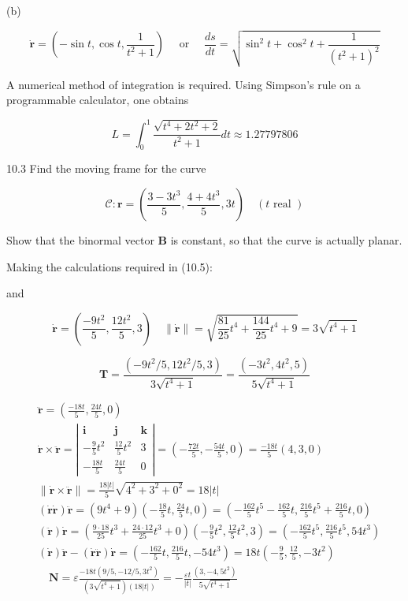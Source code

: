 \documentclass[10pt]{article}
\begin{document}
(b)

$$
\dot{\mathbf{r}}=\left(-\sin t, \cos t, \frac{1}{t^{2}+1}\right) \quad \text { or } \quad \frac{d s}{d t}=\sqrt{\sin ^{2} t+\cos ^{2} t+\frac{1}{\left(t^{2}+1\right)^{2}}}
$$

A numerical method of integration is required. Using Simpson's rule on a programmable calculator, one obtains

$$
L=\int_{0}^{1} \frac{\sqrt{t^{4}+2 t^{2}+2}}{t^{2}+1} d t \approx 1.27797806
$$

10.3 Find the moving frame for the curve

$$
\mathscr{C}: \mathbf{r}=\left(\frac{3-3 t^{3}}{5}, \frac{4+4 t^{3}}{5}, 3 t\right) \quad(t \text { real })
$$

Show that the binormal vector $\mathbf{B}$ is constant, so that the curve is actually planar.

Making the calculations required in (10.5):

and

$$
\dot{\mathbf{r}}=\left(\frac{-9 t^{2}}{5}, \frac{12 t^{2}}{5}, 3\right) \quad\|\dot{\mathbf{r}}\|=\sqrt{\frac{81}{25} t^{4}+\frac{144}{25} t^{4}+9}=3 \sqrt{t^{4}+1}
$$

$$
\mathbf{T}=\frac{\left(-9 t^{2} / 5,12 t^{2} / 5,3\right)}{3 \sqrt{t^{4}+1}}=\frac{\left(-3 t^{2}, 4 t^{2}, 5\right)}{5 \sqrt{t^{4}+1}}
$$

$$
\begin{aligned}
& \ddot{\mathbf{r}}=\left(\frac{-18 t}{5}, \frac{24 t}{5}, 0\right) \\
& \dot{\mathbf{r}} \times \ddot{\mathbf{r}}=\left|\begin{array}{ccc}
\mathbf{i} & \mathbf{j} & \mathbf{k} \\
-\frac{9}{5} t^{2} & \frac{12}{5} t^{2} & 3 \\
-\frac{18 t}{5} & \frac{24 t}{5} & 0
\end{array}\right|=\left(-\frac{72 t}{5},-\frac{54 t}{5}, 0\right)=\frac{-18 t}{5}(4,3,0) \\
& \|\dot{\mathbf{r}} \times \ddot{\mathbf{r}}\|=\frac{18|t|}{5} \sqrt{4^{2}+3^{2}+0^{2}}=18|t| \\
& (\dot{\mathbf{r}} \dot{\mathbf{r}}) \ddot{\mathbf{r}}=\left(9 t^{4}+9\right)\left(-\frac{18}{5} t, \frac{24}{5} t, 0\right)=\left(-\frac{162}{5} t^{5}-\frac{162}{5} t, \frac{216}{5} t^{5}+\frac{216}{5} t, 0\right) \\
& (\ddot{\mathbf{r}}) \dot{\mathbf{r}}=\left(\frac{9 \cdot 18}{25} t^{3}+\frac{24 \cdot 12}{25} t^{3}+0\right)\left(-\frac{9}{5} t^{2}, \frac{12}{5} t^{2}, 3\right)=\left(-\frac{162}{5} t^{5}, \frac{216}{5} t^{5}, 54 t^{3}\right) \\
& (\dot{\mathbf{r}}) \ddot{\mathbf{r}}-(\dot{\mathbf{r}} \ddot{\mathbf{r}}) \dot{\mathbf{r}}=\left(-\frac{162}{5} t, \frac{216}{5} t,-54 t^{3}\right)=18 t\left(-\frac{9}{5}, \frac{12}{5},-3 t^{2}\right) \\
& \quad \mathbf{N}=\varepsilon \frac{-18 t\left(9 / 5,-12 / 5,3 t^{2}\right)}{\left(3 \sqrt{t^{4}+1}\right)(18|t|)}=-\frac{\varepsilon t}{|t|} \frac{\left(3,-4,5 t^{2}\right)}{5 \sqrt{t^{4}+1}}
\end{aligned}
$$
\end{document}
